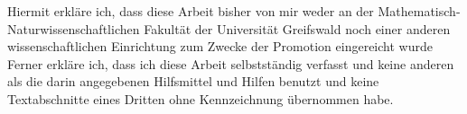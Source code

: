 \thispagestyle{empty}

    Hiermit erkläre ich, dass diese Arbeit bisher von mir weder an der Mathematisch-Naturwissenschaftlichen Fakultät der Universität Greifswald noch einer anderen wissenschaftlichen Einrichtung zum Zwecke der Promotion eingereicht wurde Ferner erkläre ich, dass ich diese Arbeit selbstständig verfasst und keine anderen als die darin angegebenen Hilfsmittel und Hilfen benutzt und keine Textabschnitte eines Dritten ohne Kennzeichnung übernommen habe.%

